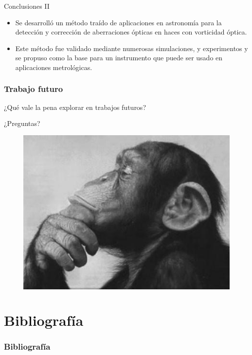 \documentclass[xcolor=table,serif]{beamer}
\begin{document}
\begin{frame}{Conclusiones II}
\small
\begin{itemize}
\item Se desarrolló un método traído de aplicaciones
  en astronomía para la detección y corrección de aberraciones ópticas
  en haces con vorticidad óptica.
\pause
\item Este método fue validado mediante numerosas simulaciones, y
  experimentos y se propuso como la base para un instrumento que puede
  ser usado en aplicaciones metrológicas. 
\end{itemize}
\end{frame}

\begin{frame}
  \frametitle{Trabajo futuro}
    ¿Qué vale la pena explorar en trabajos futuros?	
\end{frame}
\begin{frame}{¿Preguntas?}
  \begin{figure}
    \centering
    \includegraphics[scale=0.5]{Figures/presentation/thinker.jpeg}	
  \end{figure}
\end{frame}

\section{Bibliografía}
\tiny
  \begin{frame}[allowframebreaks]
  \frametitle{Bibliograf\'ia}
\nocite{*}
  
  
  \end{frame}
\end{document}
